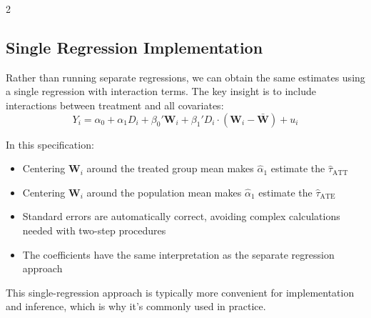 \documentclass[12pt]{article}
\begin{document}
\begin{multicols}{2}
\subsection*{Single Regression Implementation}

Rather than running separate regressions, we can obtain the same estimates using a single regression with interaction terms.
The key insight is to include interactions between treatment and all covariates:
$$Y_i = \alpha_0 + \alpha_1 D_i + \beta_0' \bm{W}_i + \beta_1' D_i \cdot (\bm{W}_i - \bar{\bm{W}}) + u_i$$

In this specification:
\begin{itemize}
  \item Centering $\bm{W}_i$ around the treated group mean makes $\hat{\alpha}_1$ estimate the $\hat{\tau}_{\text{ATT}}$
  \item Centering $\bm{W}_i$ around the population mean makes $\hat{\alpha}_1$ estimate the $\hat{\tau}_{\text{ATE}}$
  \item Standard errors are automatically correct, avoiding complex calculations needed with two-step procedures
  \item The coefficients have the same interpretation as the separate regression approach
\end{itemize}

This single-regression approach is typically more convenient for implementation and inference, which is why it's commonly used in practice.


\end{multicols}
\end{document}
